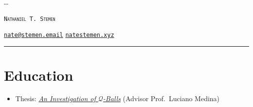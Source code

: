 \documentclass{cultvoucher}
\begin{document}
\thispagestyle{firststyle}


\begin{adjustwidth}{\dimexpr-\marginparsep-\marginparwidth}{}
	\begin{center}
		{\HUGE \textsc{\texttt{Nathaniel T. Stemen}}\par}
		\href{mailto:nate@stemen.email}{\texttt{nate@stemen.email}} \textbullet{}
		\href{https://natestemen.xyz}{\texttt{natestemen.xyz}}
		\rule{\dimexpr\textwidth+\marginparsep+\marginparwidth}{0.4pt}\par
	\end{center}
\end{adjustwidth}

\section{Education}

\begin{itemize}
	\vspace{-0.25em}
	\item Thesis: \href{https://natestemen.xyz/qv-thesis.pdf}{\textit{An Investigation of $\mathcal{Q}$-Balls}} (Advisor Prof.\ Luciano Medina)
\end{itemize}
\end{document}
